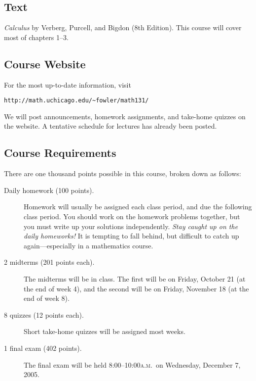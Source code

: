 \documentclass[12pt,letterpaper]{article}
\newcommand{\ayem}{\textsc{a.m.}}
\begin{document}
\vfill
\subsection*{Text}

\textit{Calculus} by Verberg, Purcell, and Bigdon (8th Edition).  This course will cover most of chapters 1--3.

\vfill
\subsection*{Course Website}

For the most up-to-date information, visit
\begin{center}
\verb+http://math.uchicago.edu/~fowler/math131/+
\end{center}
We will post announcements, homework assignments, and take-home
quizzes on the website.  A tentative schedule for lectures has already
been posted.

\vfill
\subsection*{Course Requirements}

There are one thousand points possible in this course, broken down as follows:
\begin{description}
\item[Daily homework (100 points).]  Homework will usually be assigned
each class period, and due the following class period.  You should
work on the homework problems together, but you must write up your
solutions independently.  {\em Stay caught up on the daily
homeworks!}  It is tempting to fall behind, but difficult to catch up
again---especially in a mathematics course.
\item[2 midterms (201 points each).]  The midterms will be
in class.  The first will be on Friday, October 21 (at the end of week 4), and
the second will be on Friday, November 18 (at the end of week 8).
\item[8 quizzes (12 points each).]  Short take-home quizzes will be assigned most weeks.
\item[1 final exam (402 points).]  The final exam will be held
8:00--10:00\ayem\ on Wednesday, December 7, 2005.
\end{description}
\end{document}
